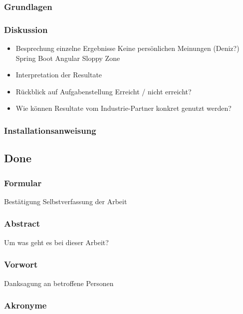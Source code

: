 \documentclass[../main.tex]{subfiles}
\begin{document}
	\subsubsection{Grundlagen}
	
	\subsubsection{Diskussion}
	\begin{itemize}
		\item Besprechung einzelne Ergebnisse
		\subitem Keine persönlichen Meinungen (Deniz?)
		\subitem Spring Boot
		\subitem Angular
		\subitem Sloppy Zone
		
		\item Interpretation der Resultate
		
		\item Rückblick auf Aufgabenstellung
		\subitem Erreicht / nicht erreicht?
		
		\item Wie können Resultate vom Industrie-Partner konkret genutzt werden?
	\end{itemize}
	
	\subsubsection{Installationsanweisung}
	\subsection{Done}

	\subsubsection{Formular}
	Bestätigung Selbstverfassung der Arbeit %

	\subsubsection{Abstract}
	Um was geht es bei dieser Arbeit? %

	\subsubsection{Vorwort}
	Danksagung an betroffene Personen
	
	\subsubsection{Akronyme}
	
\end{document}
